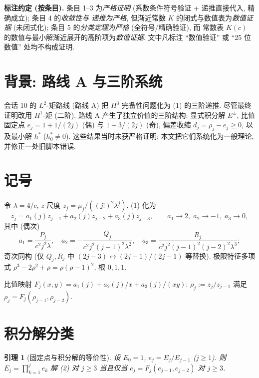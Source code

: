 \documentclass[UTF8]{ctexart}
\newtheorem{lemma}[theorem]{引理}
\begin{document}
\medskip
\noindent\textbf{标注约定 (按条目).} 条目 1--3 为\emph{严格证明}
(系数条件符号验证 + 递推直接代入, 精确成立); 条目 4 的\emph{收敛性与
递推为严格}, 但渐近常数 $K$ 的闭式与数值表为\emph{数值证据}
(未闭式化); 条目 5 的\emph{分类定理为严格} (全符号/精确验证), 而
常数表 $K(c)$ 的数值与最小解渐近展开的高阶项为\emph{数值证据}.
文中凡标注 ``数值验证'' 或 ``25 位数值'' 处均不构成证明.

\tableofcontents

\section{背景: 路线 A 与三阶系统}

会话 10 的 $L^2$-矩路线 (路线 A) 把 $H^3$ 完备性问题化为 (1) 的三阶递推.
尽管最终证明改用 $H^1$-矩 (二阶), 路线 A 产生了独立价值的三阶结构:
显式积分解 $E^\pm$, 比值固定点 $e_j = 1 + 1/(2j)$ (偶) 与 $1 + 3/(2j)$ (奇),
偏差收缩 $d_j = \rho_j - e_j \geq 0$, 以及最小解 $h^*$ ($h^*_0 \neq 0$).
这些结果当时未获严格证明; 本文把它们系统化为一般理论, 并修正一处旧脚本错误.

\section{记号}

令 $\lambda = 4/c$, $z$-尺度 $z_j = \mu_j/((j!)^2 \lambda^j)$. (1) 化为
\begin{equation}
	z_j = a_1(j) z_{j-1} + a_2(j) z_{j-2} + a_3(j) z_{j-3},
	\qquad a_1 \to 2,\; a_2 \to -1,\; a_3 \to 0,
\end{equation}
其中 (偶次)
\[
	a_1 = \frac{P_j}{c^2 j^2 \lambda},\quad
	a_2 = -\frac{Q_j}{c^2 j^2 (j-1)^2 \lambda^2},\quad
	a_3 = \frac{R_j}{c^2 j^2 (j-1)^2 (j-2)^2 \lambda^3};
\]
奇次同构 (仅 $Q_j, R_j$ 中 $(2j-3) \leftrightarrow (2j+1)/(2j-1)$ 等替换).
极限特征多项式 $\rho^3 - 2\rho^2 + \rho = \rho(\rho-1)^2$, 根 $0, 1, 1$.

比值映射 $F_j(x,y) = a_1(j) + a_2(j)/x + a_3(j)/(xy)$:
$\rho_j := z_j/z_{j-1}$ 满足 $\rho_j = F_j(\rho_{j-1}, \rho_{j-2})$.

\section{积分解分类}

\begin{lemma}[固定点与积分解的等价性]\label{lem:fp}
	设 $E_0 = 1$, $e_j = E_j/E_{j-1}$ ($j \geq 1$). 则 $E_j = \prod_{k=1}^j e_k$
	解 (2) 对 $j \geq 3$ 当且仅当 $e_j = F_j(e_{j-1}, e_{j-2})$ 对 $j \geq 3$.
\end{lemma}
\end{document}
